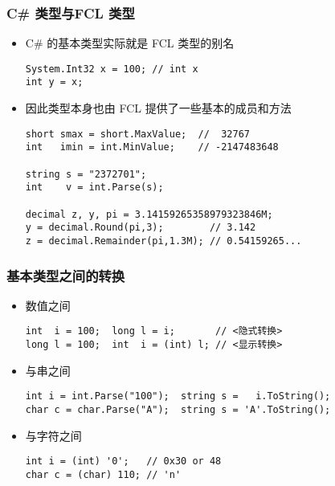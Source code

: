 \begin{frame}[fragile]
\frametitle{C\# 类型与FCL 类型}
\begin{itemize}
\item C\# 的基本类型实际就是 FCL 类型的别名
\begin{lstlisting}
System.Int32 x = 100; // int x
int y = x;
\end{lstlisting}
\pause
\item 因此类型本身也由 FCL 提供了一些基本的成员和方法

\begin{lstlisting}
short smax = short.MaxValue;  //  32767
int   imin = int.MinValue;    // -2147483648

string s = "2372701";
int    v = int.Parse(s);

decimal z, y, pi = 3.14159265358979323846M;
y = decimal.Round(pi,3);        // 3.142
z = decimal.Remainder(pi,1.3M); // 0.54159265...

\end{lstlisting}
\end{itemize}
\end{frame}

\begin{frame}[fragile]
\frametitle{基本类型之间的转换}
\begin{itemize}
\item 数值之间
\begin{lstlisting}[escapeinside=<>]
int  i = 100;  long l = i;       // <隐式转换>
long l = 100;  int  i = (int) l; // <显示转换>
\end{lstlisting}
\pause
\item 与串之间
\begin{lstlisting}
int i = int.Parse("100");  string s =   i.ToString();
char c = char.Parse("A");  string s = 'A'.ToString();
\end{lstlisting}
\pause
\item 与字符之间
\begin{lstlisting}
int i = (int) '0';   // 0x30 or 48
char c = (char) 110; // 'n'
\end{lstlisting}
\end{itemize}
\end{frame}

